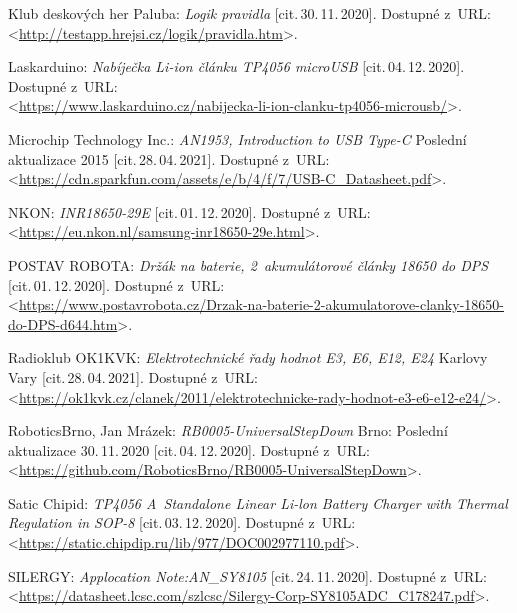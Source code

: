 \begin{thebibliography}{99}
    Klub deskových her Paluba:
    \emph{Logik pravidla}
    [cit.\,30.\,11.\,2020].
    Dostupné z~URL:\\
    <\url{http://testapp.hrejsi.cz/logik/pravidla.htm}>.

    Laskarduino:
    \emph{Nabíječka Li-ion článku TP4056 microUSB}
    [cit.\,04.\,12.\,2020].
    Dostupné z~URL:\\
    <\url{https://www.laskarduino.cz/nabijecka-li-ion-clanku-tp4056-microusb/}>.

    Microchip Technology Inc.:
    \emph{AN1953, Introduction to USB Type-C}
    Poslední aktualizace 2015 [cit.\,28.\,04.\,2021].
    Dostupné z~URL:\\
    <\url{https://cdn.sparkfun.com/assets/e/b/4/f/7/USB-C_Datasheet.pdf}>.

    NKON:
    \emph{INR18650-29E}
    [cit.\,01.\,12.\,2020].
    Dostupné z~URL:\\
    <\url{https://eu.nkon.nl/samsung-inr18650-29e.html}>.

    POSTAV ROBOTA:
    \emph{Držák na baterie, 2~akumulátorové články 18650 do DPS}
    [cit.\,01.\,12.\,2020].
    Dostupné z~URL:\\
    <\url{https://www.postavrobota.cz/Drzak-na-baterie-2-akumulatorove-clanky-18650-do-DPS-d644.htm}>.

    Radioklub OK1KVK:
    \emph{Elektrotechnické řady hodnot E3, E6, E12, E24}
    Karlovy Vary [cit.\,28.\,04.\,2021].
    Dostupné z~URL:\\
    <\url{https://ok1kvk.cz/clanek/2011/elektrotechnicke-rady-hodnot-e3-e6-e12-e24/}>.

    RoboticsBrno, Jan Mrázek:
    \emph{RB0005-UniversalStepDown}
    Brno: Poslední aktualizace 30.\,11.\,2020 [cit.\,04.\,12.\,2020].
    Dostupné z~URL:\\
    <\url{https://github.com/RoboticsBrno/RB0005-UniversalStepDown}>.

    Satic Chipid:
    \emph{TP4056 A~Standalone Linear Li-lon Battery Charger with Thermal Regulation in SOP-8 }
    [cit.\,03.\,12.\,2020].
    Dostupné z~URL:\\
    <\url{https://static.chipdip.ru/lib/977/DOC002977110.pdf}>.

    SILERGY:
    \emph{Applocation Note:AN\_SY8105}
    [cit.\,24.\,11.\,2020].
    Dostupné z~URL:\\
    <\url{https://datasheet.lcsc.com/szlcsc/Silergy-Corp-SY8105ADC_C178247.pdf}>.


\end{thebibliography}
